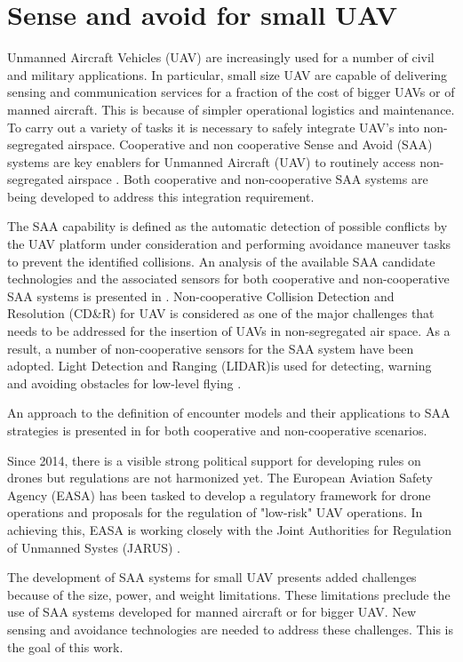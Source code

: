 \section*{Sense and avoid for small UAV}
Unmanned Aircraft Vehicles (UAV) are increasingly used for a number of civil and military applications. 
In particular, small size UAV are capable of delivering sensing and communication services for a fraction of the cost of bigger UAVs or of manned aircraft. This is because of simpler operational logistics and maintenance. 
To carry out a variety of tasks it is necessary to safely integrate UAV's into non-segregated airspace.
Cooperative and non cooperative Sense and Avoid (SAA) systems are key enablers for Unmanned Aircraft (UAV) to
routinely access non-segregated airspace \cite{spriesterbach2013unmanned}.
Both cooperative and non-cooperative SAA systems are being developed to address this integration requirement.

The SAA capability is defined as the automatic detection of possible conflicts by the UAV platform under
consideration and performing avoidance maneuver tasks to prevent the identified collisions.
An analysis of the available SAA candidate technologies and the associated
sensors for both cooperative and non-cooperative SAA systems is presented in \cite{muraru2011critical}.
Non-cooperative Collision Detection and Resolution (CD\&R) for UAV is considered as one of the major challenges that needs to be addressed \cite{lai2012see} for the insertion of UAVs in non-segregated air space.
As a result, a number of non-cooperative sensors for the SAA system have been adopted. Light Detection and Ranging (LIDAR)is used for
detecting, warning and avoiding obstacles for low-level flying \cite{sabatini2014lidar}.

An approach to the definition of encounter models and their applications to SAA strategies is presented in \cite{kochenderfer2008encounter} for both cooperative and non-cooperative scenarios.

Since 2014, there is a visible strong political support for developing rules on drones but regulations are not harmonized yet. The European Aviation Safety Agency (EASA) has been tasked to develop a regulatory framework for drone operations and proposals for the regulation of "low-risk" UAV operations. In achieving this, EASA is working closely with the Joint Authorities for Regulation of Unmanned Systes (JARUS) \cite{jarus2016regulations}.

The development of SAA systems for small UAV presents added challenges because of the size, power, and weight limitations. These limitations preclude the use of SAA systems developed for manned aircraft or for bigger UAV. New sensing and avoidance technologies are needed to address these challenges. This is the goal of this work.


